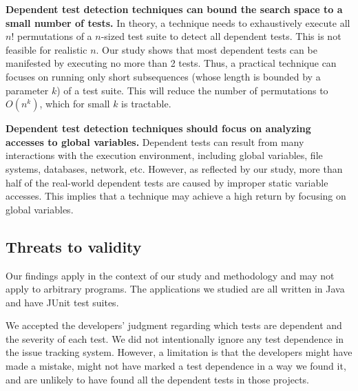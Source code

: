 \vspace{1mm}
\noindent \textbf{Dependent test detection techniques
can bound the search space to a small number of tests.}
In theory, a technique needs to exhaustively execute
all $n!$ permutations of a $n$-sized
test suite to detect all dependent tests. This is
not feasible for realistic $n$.  Our study shows that
most dependent tests can be manifested by executing
no more than 2 tests. Thus, a practical technique
can focuses on running only short subsequences (whose
length is bounded by a parameter $k$)
of a test suite. This will reduce the number of permutations
to $O(n^k)$, which for small $k$ is tractable.

\vspace{1mm}
\noindent \textbf{Dependent test detection techniques
should focus on analyzing accesses to global variables.}
Dependent tests can result from many
interactions with the execution environment, including
global variables, file systems, databases, network, etc.
However, as reflected by our study, more than half of the
real-world dependent tests are caused
by improper static variable accesses. This implies that a technique
may achieve a high return by focusing on global variables.




\subsection{Threats to validity}

Our findings apply in the context of our study and methodology and may not
apply to arbitrary programs.
The applications we studied are all written in 
Java and have JUnit test suites.  

We accepted the developers' judgment regarding which tests are dependent
and the severity of each test.  We did not intentionally ignore
any test dependence in the issue tracking system.
However, a limitation is that the developers might have made a mistake,
might not have marked a test dependence in a way we found it, and are
unlikely to have found all the dependent tests in those projects. 


